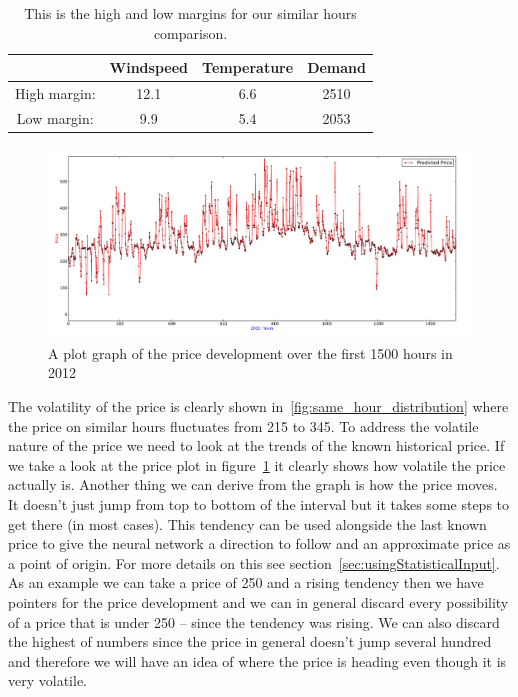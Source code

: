 \begin{table}[H]
\centering  %
\begin{tabular}{|c|c|c|c|} %
	\hline
 & Windspeed & Temperature & Demand \\ [0.5ex] %
\hline                  %
High margin: & 12.1 & 6.6 & 2510  \\ \hline
Low margin: & 9.9 & 5.4 & 2053 \\  \hline
\end{tabular}
\caption{This is the high and low margins for our similar hours comparison.} %
\label{table:similarHoursLimits} %
\end{table}

\begin{figure}[H]
\centering
\includegraphics[width=\textwidth ]{billeder/energy_price_plots/plotGraph.jpg}
\caption{A plot graph of the price development over the first 1500 hours in 2012}
\label{fig:plotGraph}
\end{figure}

The volatility of the price is clearly shown in~\ref{fig:same_hour_distribution} where the price on similar hours fluctuates from 215 to 345. To address the volatile nature of the price we need to look at the trends of the known historical price. If we take a look at the price plot in figure~\ref{fig:plotGraph} it clearly shows how volatile the price actually is. Another thing we can derive from the graph is how the price moves. It doesn't just jump from top to bottom of the interval but it takes some steps to get there (in most cases). This tendency can be used alongside the last known price to give the neural network a direction to follow and an approximate price as a point of origin. For more details on this see section~\ref{sec:usingStatisticalInput}. As an example we can take a price of 250 and a rising tendency then we have pointers for the price development and we can in general discard every possibility of a price that is under 250 -- since the tendency was rising. We can also discard the highest of numbers since the price in general doesn't jump several hundred and therefore we will have an idea of where the price is heading even though it is very volatile.

